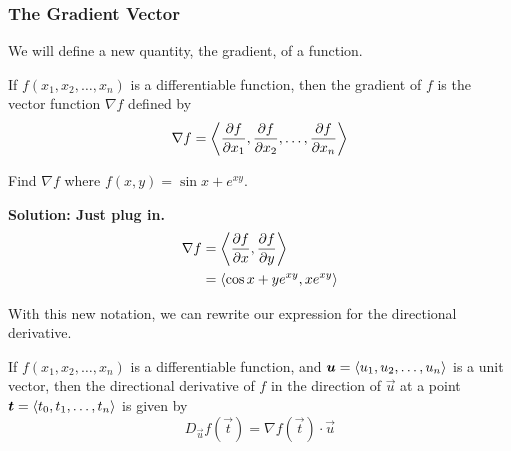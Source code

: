 \subsubsection{The Gradient Vector}
We will define a new quantity, the gradient, of a function. 
\begin{definition}
    If \(f(x_1, x_2, \dots, x_n)\) is a differentiable function, then the gradient of \(f\) is the vector function \(\nabla f\) defined by
    \[ \nabla f = \left\langle\pdv{f}{x_1}, \pdv{f}{x_2}, \dots, \pdv{f}{x_n}\right\rangle \]
\end{definition}
\begin{example}
    Find \(\nabla f\) where \(f(x,y)=\sin x + e^{xy}\).\par\bf{Solution: }Just plug in.
    \begin{align*}
        \nabla f &= \left\langle\pdv{f}{x}, \pdv{f}{y}\right\rangle \\
        &= \left\langle \cos x + ye^{xy}, xe^{xy} \right\rangle
    \end{align*}
\end{example}
With this new notation, we can rewrite our expression for the directional derivative.
\begin{theorem}
If \(f(x_1, x_2, \dots, x_n)\) is a differentiable function, and \(\boldsymbol{u} = \left\langle u_1, u_2, \dots, u_n\right\rangle\) is a unit vector, then the directional derivative of \(f\) in the direction of \(\vec u\) at a point \(\boldsymbol{t} = \left\langle t_0, t_1, \dots, t_n\right\rangle\) is given by 
\[ D_{\vec u}f(\vec t) = \nabla f(\vec t)\cdot \vec u\]
\end{theorem}
